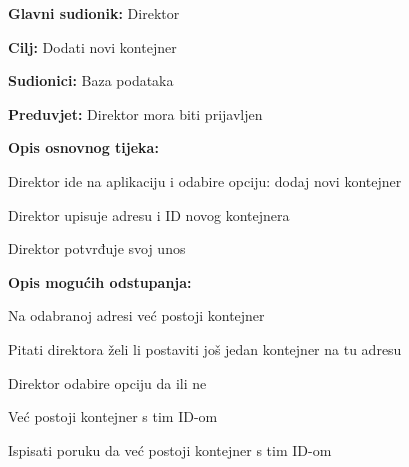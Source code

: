			\noindent {}
			\begin{packed_item}
				
				\item \textbf{Glavni sudionik: } Direktor
				\item  \textbf{Cilj:} Dodati novi kontejner
				\item  \textbf{Sudionici:} Baza podataka
				\item  \textbf{Preduvjet:} Direktor mora biti prijavljen
				\item  \textbf{Opis osnovnog tijeka:}
				
				\item[] \begin{packed_enum}
					
					\item Direktor ide na aplikaciju i odabire opciju: dodaj novi kontejner
					\item Direktor upisuje adresu i ID novog kontejnera 
					\item Direktor potvrđuje svoj unos
				\end{packed_enum}
				
				\item  \textbf{Opis mogućih odstupanja:}
				
				\item[] \begin{packed_item}
					
					\item[2.a] Na odabranoj adresi već postoji kontejner
					\item[] \begin{packed_enum}
						
						\item Pitati direktora želi li postaviti još jedan kontejner na tu adresu
						\item Direktor odabire opciju da ili ne
						
					\end{packed_enum}
					\item[2.b] Već postoji kontejner s tim ID-om
					\item[] \begin{packed_enum}
						
						\item Ispisati poruku da već postoji kontejner s tim ID-om
						
					\end{packed_enum}
					
				\end{packed_item}
			\end{packed_item}
			
